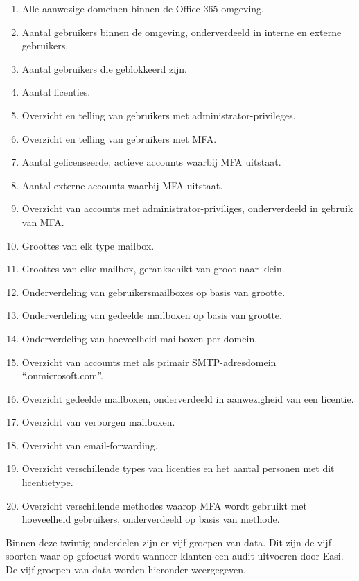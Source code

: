 \begin{enumerate}
    \item Alle aanwezige domeinen binnen de Office 365-omgeving.
    \item Aantal gebruikers binnen de omgeving, onderverdeeld in interne en externe gebruikers.
    \item Aantal gebruikers die geblokkeerd zijn.
    \item Aantal licenties.
    \item Overzicht en telling van gebruikers met administrator-privileges.
    \item Overzicht en telling van gebruikers met \ac{MFA}.
    \item Aantal gelicenseerde, actieve accounts waarbij \ac{MFA} uitstaat.
    \item Aantal externe accounts waarbij \ac{MFA} uitstaat.
    \item Overzicht van accounts met administrator-priviliges, onderverdeeld in gebruik van \ac{MFA}.
    \item Groottes van elk type mailbox.
    \item Groottes van elke mailbox, gerankschikt van groot naar klein.
    \item Onderverdeling van gebruikersmailboxes op basis van grootte.
    \item Onderverdeling van gedeelde mailboxen op basis van grootte.
    \item Onderverdeling van hoeveelheid mailboxen per domein.
    \item Overzicht van accounts met als primair \Ac{SMTP}-adresdomein “.onmicrosoft.com”.
    \item Overzicht gedeelde mailboxen, onderverdeeld in aanwezigheid van een licentie.
    \item Overzicht van verborgen mailboxen.
    \item Overzicht van email-forwarding.
    \item Overzicht verschillende types van licenties en het aantal personen met dit licentietype.
    \item Overzicht verschillende methodes waarop \ac{MFA} wordt gebruikt met hoeveelheid gebruikers, onderverdeeld op basis van methode.
\end{enumerate}

Binnen deze twintig onderdelen zijn er vijf groepen van data. Dit zijn de vijf soorten waar op gefocust wordt wanneer klanten een audit uitvoeren door Easi. De vijf groepen van data worden hieronder weergegeven. 

